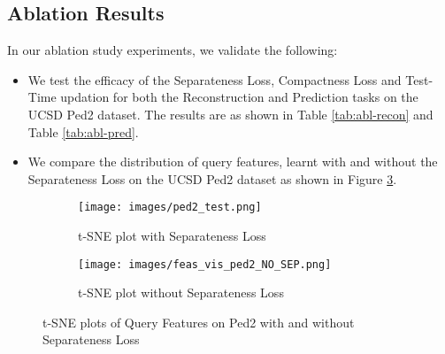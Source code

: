 \subsection{Ablation Results}
In our ablation study experiments, we validate the following:
\begin{itemize}
    \item We test the efficacy of the Separateness Loss, Compactness Loss and Test-Time updation for both the Reconstruction and Prediction tasks on the UCSD Ped2 dataset\cite{6739466}. The results are as shown in Table \ref{tab:abl-recon} and Table \ref{tab:abl-pred}. 
    \item We compare the distribution of query features, learnt with and without the Separateness Loss on the UCSD Ped2 dataset\cite{6739466} as shown in Figure \ref{fig:t-SNE plots of Query Features on Ped2 with and without Separateness Loss}.
\end{itemize}

\begin{figure}[h]
     \centering
     \begin{subfigure}[b]{0.4\textwidth}
         \centering
         \texttt{[image: images/ped2\_test.png]}
         \caption{t-SNE plot with Separateness Loss}
         \label{fig:w-sep}
     \end{subfigure}
     \hfill
     \begin{subfigure}[b]{0.4\textwidth}
         \centering
         \texttt{[image: images/feas\_vis\_ped2\_NO\_SEP.png]}
         \caption{t-SNE plot without Separateness Loss}
         \label{fig:wo-sep}
     \end{subfigure}
        \caption{t-SNE plots of Query Features on Ped2\cite{6739466} with and without Separateness Loss}
        \label{fig:t-SNE plots of Query Features on Ped2 with and without Separateness Loss}
\end{figure}

